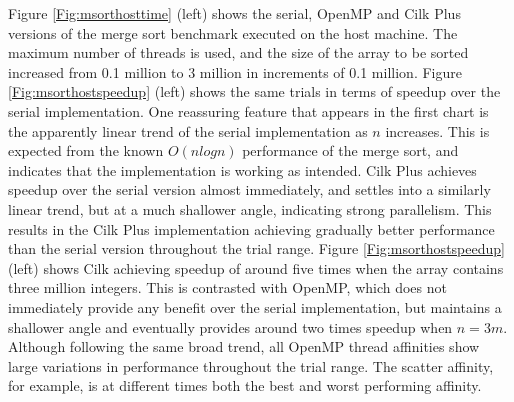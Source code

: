\documentclass{report}
\begin{document}
Figure \ref{Fig:msorthosttime} (left) shows the serial, OpenMP and Cilk Plus versions of the merge sort benchmark executed on the host machine. The maximum number of threads is used, and the size of the array to be sorted increased from 0.1 million to 3 million in increments of 0.1 million. Figure \ref{Fig:msorthostspeedup} (left) shows the same trials in terms of speedup over the serial implementation. One reassuring feature that appears in the first chart is the apparently linear trend of the serial implementation as \(n\) increases. This is expected from the known \(O(nlogn)\) performance of the merge sort, and indicates that the implementation is working as intended. Cilk Plus achieves speedup over the serial version almost immediately, and settles into a similarly linear trend, but at a much shallower angle, indicating strong parallelism. This results in the Cilk Plus implementation achieving gradually better performance than the serial version throughout the trial range. Figure \ref{Fig:msorthostspeedup} (left) shows Cilk achieving speedup of around five times when the array contains three million integers. This is contrasted with OpenMP, which does not immediately provide any benefit over the serial implementation, but maintains a shallower angle and eventually provides around two times speedup when \(n=3m\). Although following the same broad trend, all OpenMP thread affinities show large variations in performance throughout the trial range. The scatter affinity, for example, is at different times both the best and worst performing affinity.
\end{document}
